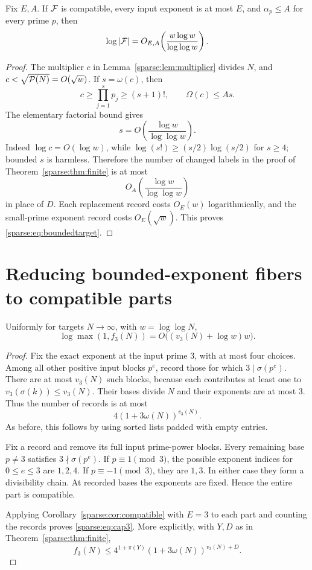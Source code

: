 \begin{corollary}\label{sparse:cor:boundedtarget}
Fix $E,A$. If $\mathcal F$ is compatible, every input exponent is at most $E$, and $\alpha_p\le A$ for every prime $p$, then
\begin{equation}\label{sparse:eq:boundedtarget}
 \log|\mathcal F|=O_{E,A}\!\left(\frac{w\log w}{\log\log w}\right).
\end{equation}
\end{corollary}
\begin{proof}
The multiplier $c$ in Lemma~\ref{sparse:lem:multiplier} divides $N$, and $c<\sqrt{\mathcal P(N)}=O(\sqrt w)$. If $s=\omega(c)$, then
\[
 c\ge\prod_{j=1}^{s}p_j\ge(s+1)!,\qquad \Omega(c)\le As.
\]
The elementary factorial bound gives
\[
 s=O\!\left(\frac{\log w}{\log\log w}\right).
\]
Indeed $\log c=O(\log w)$, while $\log(s!)\ge(s/2)\log(s/2)$ for $s\ge4$; bounded $s$ is harmless. Therefore the number of changed labels in the proof of Theorem~\ref{sparse:thm:finite} is at most
\[
 O_A\!\left(\frac{\log w}{\log\log w}\right)
\]
in place of $D$. Each replacement record costs $O_E(w)$ logarithmically, and the small-prime exponent record costs $O_E(\sqrt w)$. This proves \eqref{sparse:eq:boundedtarget}.
\end{proof}


\section{Reducing bounded-exponent fibers to compatible parts}
\begin{theorem}\label{sparse:thm:cap3}
Uniformly for targets $N\to\infty$, with $w=\log\log N$,
\begin{equation}\label{sparse:eq:cap3}
 \boxed{\log\max(1,f_3(N))
 =O\bigl((v_3(N)+\log w)w\bigr).}
\end{equation}
\end{theorem}
\begin{proof}
Fix the exact exponent at the input prime $3$, with at most four choices. Among all other positive input blocks $p^e$, record those for which $3\mid\sigma(p^e)$. There are at most $v_3(N)$ such blocks, because each contributes at least one to $v_3(\sigma(k))\le v_3(N)$. Their bases divide $N$ and their exponents are at most $3$. Thus the number of records is at most
\[
 4(1+3\omega(N))^{v_3(N)}.
\]
As before, this follows by using sorted lists padded with empty entries.

Fix a record and remove its full input prime-power blocks. Every remaining base $p\ne3$ satisfies $3\nmid\sigma(p^e)$. If $p\equiv1\pmod3$, the possible exponent indices for $0\le e\le3$ are $1,2,4$. If $p\equiv-1\pmod3$, they are $1,3$. In either case they form a divisibility chain. At recorded bases the exponents are fixed. Hence the entire part is compatible.

Applying Corollary~\ref{sparse:cor:compatible} with $E=3$ to each part and counting the records proves \eqref{sparse:eq:cap3}. More explicitly, with $Y,D$ as in Theorem~\ref{sparse:thm:finite},
\[
 f_3(N)\le4^{1+\pi(Y)}(1+3\omega(N))^{v_3(N)+D}.
\]
\end{proof}

